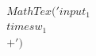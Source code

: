 \documentclass[preview]{standalone}
\begin{document}
\begin{align*}
MathTex('input _ 1  \\times  w _ 1 \\ +')
\end{align*}
\end{document}
